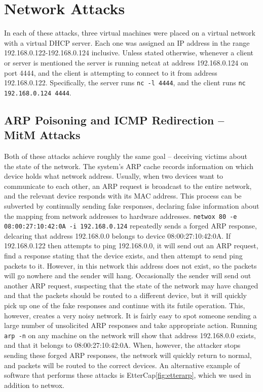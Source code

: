\section{Network Attacks}


In each of these attacks, three virtual machines were placed on a virtual network with a virtual DHCP server. Each one
was assigned an IP address in the range 192.168.0.122-192.168.0.124 inclusive. Unless stated otherwise, whenever a
client or server is mentioned the server is running netcat at address 192.168.0.124 on port 4444, and the client is
attempting to connect to it from address 192.168.0.122. Specifically, the server runs {\tt nc -l 4444}, and the client
runs {\tt nc 192.168.0.124 4444}.

\subsection{ARP Poisoning and ICMP Redirection -- MitM Attacks}

Both of these attacks achieve roughly the same goal -- deceiving victims about the state of the network. The system's
ARP cache records information on which device holds what network address. Usually, when two devices want to communicate
to each other, an ARP request is broadcast to the entire network, and the relevant device responds with its MAC address.
This process can be subverted by continually sending fake responses, declaring false information about the mapping from
network addresses to hardware addresses. {\tt netwox 80 -e 08:00:27:10:42:0A -i 192.168.0.124} repeatedly sends a forged
ARP response, delcaring that address 192.168.0.0 belongs to device 08:00:27:10:42:0A. If 192.168.0.122 then attempts to
ping 192.168.0.0, it will send out an ARP request, find a response stating that the device exists, and then attempt to
send ping packets to it. However, in this network this address does not exist, so the packets will go nowhere and the
sender will hang. Occasionally the sender will send out another ARP request, suspecting that the state of the network
may have changed and that the packets should be routed to a different device, but it will quickly pick up one of the
fake responses and continue with its futile operation. This, however, creates a very noisy network. It is fairly easy to
spot someone sending a large number of unsolicited ARP responses and take appropriate action. Running {\tt arp -n} on
any machine on the network will show that address 192.168.0.0 exists, and that it belongs to 08:00:27:10:42:0A. When,
however, the attacker stops sending these forged ARP responses, the network will quickly return to normal, and packets
will be routed to the correct devices. An alternative example of software that performs these attacks is
EtterCap\ref{fig:etterarp}, which we used in addition to netwox.

